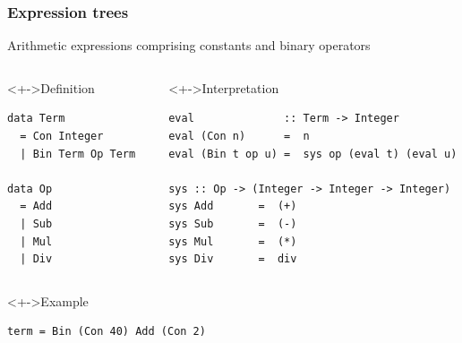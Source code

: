 \documentclass{beamer}
\begin{document}
\begin{frame}[fragile]
  \frametitle{Expression trees}
    Arithmetic expressions comprising constants and binary operators 
  \begin{columns}
    \begin{column}{0.4\linewidth}
  \begin{block}<+->{Definition}
\begin{lstlisting}
data Term
  = Con Integer
  | Bin Term Op Term  
           
data Op
  = Add 
  | Sub
  | Mul
  | Div
\end{lstlisting}  
  \end{block}
\end{column}
\begin{column}{0.55\linewidth}
  \begin{block}<+->{Interpretation}
\begin{lstlisting}
eval              :: Term -> Integer
eval (Con n)      =  n
eval (Bin t op u) =  sys op (eval t) (eval u)

sys :: Op -> (Integer -> Integer -> Integer)
sys Add       =  (+)         
sys Sub       =  (-)
sys Mul       =  (*)         
sys Div       =  div
\end{lstlisting}  
  \end{block}
\end{column}
\end{columns}
\begin{exampleblock}<+->{Example}
  \begin{minipage}{0.45\linewidth}
\begin{lstlisting}
term = Bin (Con 40) Add (Con 2)
\end{lstlisting}
  \end{minipage}
  \begin{minipage}{0.45\linewidth}
\begin{center}\footnotesize
    \end{center}
  \end{minipage}
\end{exampleblock}
  \end{frame}
\end{document}
